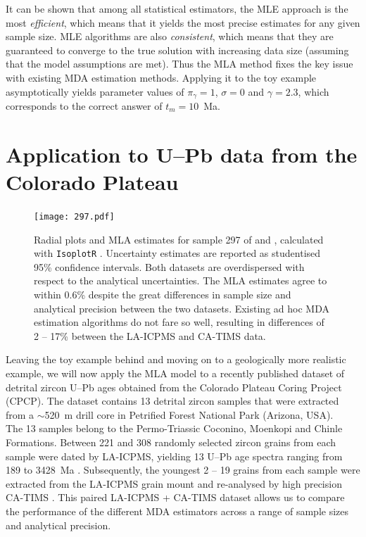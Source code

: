 \documentclass{article}
\begin{document}
It can be shown that among all statistical estimators, the MLE
approach is the most \emph{efficient}, which means that it yields the
most precise estimates for any given sample size. MLE algorithms are
also \emph{consistent}, which means that they are guaranteed to
converge to the true solution with increasing data size (assuming that
the model assumptions are met). Thus the MLA method fixes the key
issue with existing MDA estimation methods. Applying it to the toy
example asymptotically yields parameter values of $\pi_\gamma = 1$,
$\sigma = 0$ and $\gamma = 2.3$, which corresponds to the correct
answer of $t_m = 10$~Ma.

\section{Application to U--Pb data from the Colorado Plateau}
\label{sec:examples}

\begin{figure}[!ht]
  \centering
  \texttt{[image: 297.pdf]}
  \parbox{.9\textwidth}{
    \caption{Radial plots and MLA estimates for sample 297 of
      \citet[][LA-ICPMS data, left]{gehrels2020} and \citet[][CA-TIMS
        data, right]{rasmussen2020}, calculated with \texttt{IsoplotR}
      \citep{vermeesch2018b}.  Uncertainty estimates are reported as
      studentised 95\% confidence intervals. Both datasets are
      overdispersed with respect to the analytical uncertainties. The
      MLA estimates agree to within 0.6\% despite the great differences
      in sample size and analytical precision between the two
      datasets. Existing ad hoc MDA estimation algorithms do not fare so
      well, resulting in differences of 2 -- 17\% between the LA-ICPMS
      and CA-TIMS data.}
    \label{fig:297}
  }
\end{figure}

Leaving the toy example behind and moving on to a geologically more
realistic example, we will now apply the MLA model to a recently
published dataset of detrital zircon U--Pb ages obtained from the
Colorado Plateau Coring Project (CPCP). The dataset contains 13
detrital zircon samples that were extracted from a $\sim$520~m drill
core in Petrified Forest National Park (Arizona, USA).\\

The 13 samples belong to the Permo-Triassic Coconino, Moenkopi and
Chinle Formations.  Between 221 and 308 randomly selected zircon
grains from each sample were dated by LA-ICPMS, yielding 13 U--Pb age
spectra ranging from 189 to 3428~Ma \citep{gehrels2020}. Subsequently,
the youngest 2 -- 19 grains from each sample were extracted from the
LA-ICPMS grain mount and re-analysed by high precision CA-TIMS
\citep{rasmussen2020}.  This paired LA-ICPMS + CA-TIMS dataset allows
us to compare the performance of the different MDA estimators across a
range of sample sizes and analytical precision.\\
\end{document}
